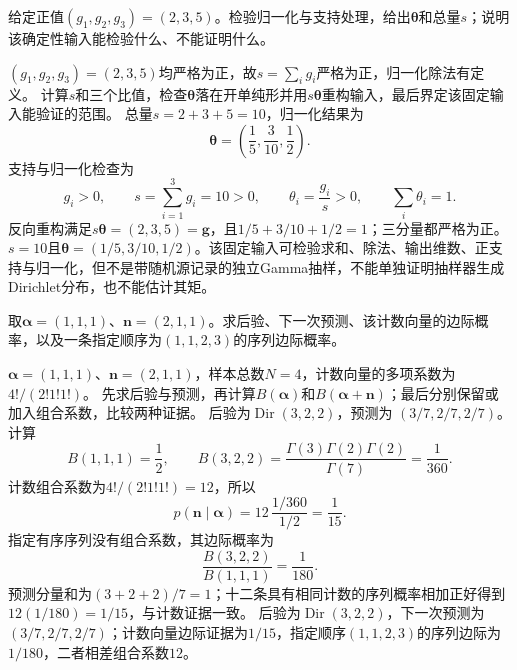 \begin{example}[Gamma归一化的确定性测试]\label{exm:V5-C05-gamma-interface}
给定正值$(g_1,g_2,g_3)=(2,3,5)$。检验归一化与支持处理，给出$\boldsymbol\theta$和总量$s$；说明该确定性输入能检验什么、不能证明什么。
\end{example}
\begin{solution}
\SolGiven $(g_1,g_2,g_3)=(2,3,5)$均严格为正，故$s=\sum_i g_i$严格为正，归一化除法有定义。
\SolPlan 计算$s$和三个比值，检查$\boldsymbol\theta$落在开单纯形并用$s\boldsymbol\theta$重构输入，最后界定该固定输入能验证的范围。
\SolDerive
\nopagebreak[4]
总量$s=2+3+5=10$，归一化结果为
\[
\boldsymbol\theta=\left(\frac15,\frac3{10},\frac12\right).
\]
支持与归一化检查为
\[
g_i>0,\qquad s=\sum_{i=1}^3g_i=10>0,\qquad
\theta_i=\frac{g_i}{s}>0,\qquad \sum_i\theta_i=1.
\]
\SolCheck 反向重构满足$s\boldsymbol\theta=(2,3,5)=\boldsymbol g$，且$1/5+3/10+1/2=1$；三分量都严格为正。
\SolAnswer $s=10$且$\boldsymbol\theta=(1/5,3/10,1/2)$。该固定输入可检验求和、除法、输出维数、正支持与归一化，但不是带随机源记录的独立Gamma抽样，不能单独证明抽样器生成Dirichlet分布，也不能估计其矩。
\end{solution}

\begin{example}[计数证据与序列证据]\label{exm:V5-C05-evidence}
取$\boldsymbol\alpha=(1,1,1)$、$\boldsymbol n=(2,1,1)$。求后验、下一次预测、该计数向量的边际概率，以及一条指定顺序为$(1,1,2,3)$的序列边际概率。
\end{example}
\begin{solution}
\SolGiven $\boldsymbol\alpha=(1,1,1)$、$\boldsymbol n=(2,1,1)$，样本总数$N=4$，计数向量的多项系数为$4!/(2!1!1!)$。
\SolPlan 先求后验与预测，再计算$B(\boldsymbol\alpha)$和$B(\boldsymbol\alpha+\boldsymbol n)$；最后分别保留或加入组合系数，比较两种证据。
\SolDerive
\nopagebreak[4]
后验为$\operatorname{Dir}(3,2,2)$，预测为
$(3/7,2/7,2/7)$。计算
\[
B(1,1,1)=\frac12,\qquad
B(3,2,2)=\frac{\Gamma(3)\Gamma(2)\Gamma(2)}{\Gamma(7)}
=\frac1{360}.
\]
计数组合系数为$4!/(2!1!1!)=12$，所以
\[
p(\boldsymbol n\mid\boldsymbol\alpha)
=12\,\frac{1/360}{1/2}=\frac1{15}.
\]
指定有序序列没有组合系数，其边际概率为
\[
\frac{B(3,2,2)}{B(1,1,1)}=\frac1{180}.
\]
\SolCheck 预测分量和为$(3+2+2)/7=1$；十二条具有相同计数的序列概率相加正好得到$12(1/180)=1/15$，与计数证据一致。
\SolAnswer 后验为$\operatorname{Dir}(3,2,2)$，下一次预测为$(3/7,2/7,2/7)$；计数向量边际证据为$1/15$，指定顺序$(1,1,2,3)$的序列边际为$1/180$，二者相差组合系数$12$。
\end{solution}

